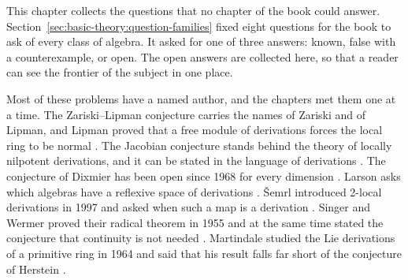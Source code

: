 This chapter collects the questions that no chapter of the book could answer. %
Section~\ref{sec:basic-theory:question-families} fixed eight questions for the %
book to ask of every class of algebra. %
It asked for one of three answers: known, false with a counterexample, or open. %
The open answers are collected here, so that a reader can see the frontier of %
the subject in one place. %


Most of these problems have a named author, and the chapters met them one %
at a time. %
The Zariski--Lipman conjecture carries the names of Zariski and of Lipman, and %
Lipman proved that a free module of derivations forces the local ring to be %
normal \cite[p.~270]{BiswasGurjarKolte2014}. %
The Jacobian conjecture stands behind the theory of locally nilpotent %
derivations, and it can be stated in the language of derivations %
\cite[p.~81]{Freudenburg2017}.
The conjecture of Dixmier has been open since 1968 for every dimension %
\cite[pp.~1--2]{Bavula2017}.
Larson asks which algebras have a reflexive space of derivations %
\cite[p.~703]{HadwinLi2004}.
\v{S}emrl introduced 2-local derivations in 1997 and asked when such a map is a
derivation \cite[p.~1]{AyupovYusupov2020}. %
Singer and Wermer proved their radical theorem in 1955 and at the same time %
stated the conjecture that continuity is not needed %
\cite[p.~710]{BresarVillena2002}.
Martindale studied the Lie derivations of a primitive ring in 1964 and said that %
his result falls far short of the conjecture of Herstein %
\cite[p.~183]{Martindale1964}.

